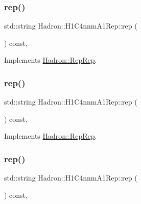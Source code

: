 \subsubsection{\texorpdfstring{rep()}{rep()}\hspace{0.1cm}{\footnotesize\ttfamily [1/3]}}
{\footnotesize\ttfamily std\+::string Hadron\+::\+H1\+C4nnm\+A1\+Rep\+::rep (\begin{DoxyParamCaption}{ }\end{DoxyParamCaption}) const\hspace{0.3cm}{\ttfamily [inline]}, {\ttfamily [virtual]}}



Implements \mbox{\hyperlink{structHadron_1_1RepRep_ab3213025f6de249f7095892109575fde}{Hadron\+::\+Rep\+Rep}}.

\mbox{\label{structHadron_1_1H1C4nnmA1Rep_a66b6495d208ea091b2e8b5e45bf67c29}} 
\subsubsection{\texorpdfstring{rep()}{rep()}\hspace{0.1cm}{\footnotesize\ttfamily [2/3]}}
{\footnotesize\ttfamily std\+::string Hadron\+::\+H1\+C4nnm\+A1\+Rep\+::rep (\begin{DoxyParamCaption}{ }\end{DoxyParamCaption}) const\hspace{0.3cm}{\ttfamily [inline]}, {\ttfamily [virtual]}}



Implements \mbox{\hyperlink{structHadron_1_1RepRep_ab3213025f6de249f7095892109575fde}{Hadron\+::\+Rep\+Rep}}.

\mbox{\label{structHadron_1_1H1C4nnmA1Rep_a66b6495d208ea091b2e8b5e45bf67c29}} 
\subsubsection{\texorpdfstring{rep()}{rep()}\hspace{0.1cm}{\footnotesize\ttfamily [3/3]}}
{\footnotesize\ttfamily std\+::string Hadron\+::\+H1\+C4nnm\+A1\+Rep\+::rep (\begin{DoxyParamCaption}{ }\end{DoxyParamCaption}) const\hspace{0.3cm}{\ttfamily [inline]}, {\ttfamily [virtual]}}




